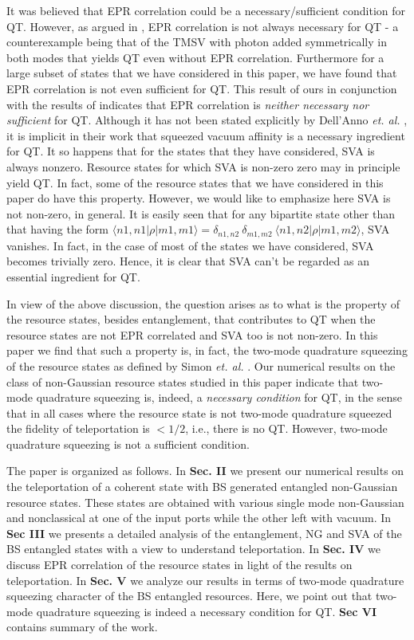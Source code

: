 \documentclass[letter,scriptaddress,twocolumn, prl,showkeys]{revtex4}
\begin{document}
It was believed \cite{tp_yang,tp_agarwal,tp_zubairy} that EPR correlation could be a necessary/sufficient condition for QT. 
However, as argued in \cite{tp_lee,tp_wang}, EPR correlation is not always necessary for QT - a counterexample being that of the TMSV with photon added symmetrically in both modes that yields QT even without EPR correlation.
Furthermore for a large subset of states that we have considered in this paper, we have found that EPR correlation is not even sufficient for QT.
This result of ours in conjunction with the results of \cite{tp_lee,tp_wang} indicates that EPR correlation is \emph{neither necessary nor sufficient} for QT.
Although it has not been stated explicitly by Dell'Anno \textit{et. al.} \cite{tp_illuminati}, it is implicit in their work that squeezed vacuum affinity is a necessary ingredient for QT.
It so happens that for the states that they have considered, SVA is always nonzero.
Resource states for which SVA is non-zero zero may in principle yield QT. 
In fact, some of the resource states that we have considered in this paper do have this property.
However, we would like to emphasize here SVA is not non-zero, in general. It is easily seen that for any bipartite state other than that having the form $\langle n1,n1|\rho|m1,m1\rangle=\delta_{n1,n2}~\delta_{m1,m2}~ \langle n1,n2|\rho|m1,m2\rangle$, SVA vanishes.
In fact, in the case of most of the states we have considered, SVA becomes trivially zero.
Hence, it is clear that SVA can't be regarded as an essential ingredient for QT.

In view of the above discussion, the question arises as to what is the property of the resource states, besides entanglement, that contributes to QT when the resource states are not EPR correlated and SVA too is not non-zero.
In this paper we find that such a property is, in fact, the two-mode quadrature squeezing of the resource states as defined by Simon \emph{et. al.} \cite{qs_simon}.
Our numerical results on the class of non-Gaussian resource states studied in this paper indicate that two-mode quadrature squeezing is, indeed, a \emph{necessary condition} for QT, in the sense that in all cases where the resource state is not two-mode quadrature squeezed the fidelity of teleportation is $<1/2$, i.e., there is no QT. However, two-mode quadrature squeezing is not a sufficient condition.

The paper is organized as follows. 
In {\bf Sec. II} we present our numerical results on the teleportation of a coherent state with BS generated entangled non-Gaussian resource states. These states are obtained with various single mode non-Gaussian and nonclassical at one of the input ports while the other left with vacuum. 
In {\bf Sec III} we presents a detailed analysis of the entanglement, NG and SVA of the BS entangled states with a view to understand teleportation. 
In {\bf Sec. IV} we discuss EPR correlation of the resource states in light of the results on teleportation.
In {\bf Sec. V} we analyze our results in terms of two-mode quadrature squeezing character of the BS entangled resources. 
Here, we point out that two-mode quadrature squeezing is indeed a necessary condition for QT. 
{\bf Sec VI} contains summary of the work.
\end{document}
